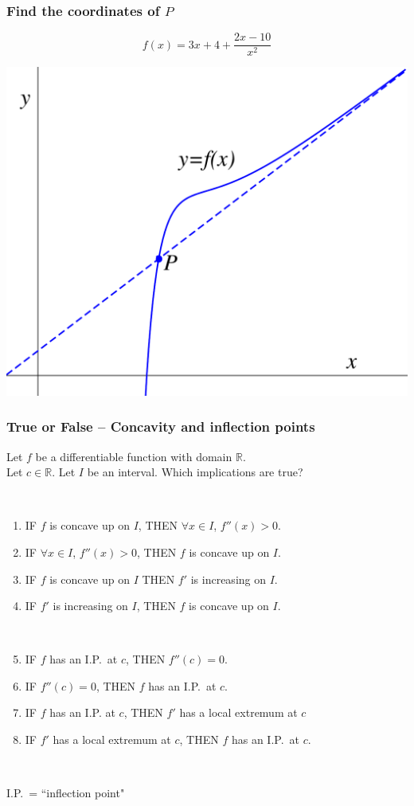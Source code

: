 \documentclass[14pt]{beamer}
\newcommand {\R}{\mathbb{R}}
\newcommand{\azul}[1]{{\color{blue} #1}}
\newcommand{\rojo}[1]{{\color{red} #1}}
\newcommand{\verde}[1]{{\color{verde} #1}}
\newcommand{\rosa}[1]{{\color{rosa} #1}}
\newcommand{\naranja}[1]{{\color{naranja} #1}}
\newcommand{\violeta}[1]{{\color{violet} #1}}
\newcommand{\setsize}[1]{\fontsize{#1}{#1}\selectfont} %
\newcommand{\smallerfont}{\setsize{13}} %
\begin{document}
\begin{frame}[t]
\frametitle{Find the coordinates of $P$ }

$$f(x) = 3x+4 +  \frac{2x-10}{x^2}$$

\begin{center}
\includegraphics[scale=0.4]{G17}
\end{center}

\end{frame}
\begin{frame}[t]
\smallerfont
\frametitle{True or False -- Concavity and inflection points}

Let $f$ be a {{differentiable}} function with domain $\R$.  \\
Let $c \in \R$.  Let $I$ be an interval.  Which implications are true?

\
\begin{enumerate}
	\item	 IF \rojo{$f$ is concave up on $I$}, \quad  THEN \azul{$\forall x \in I$, $f''(x) >0$}.
	\item	 IF \azul{$\forall x \in I$, $f''(x) >0$}, \quad THEN \rojo{$f$ is concave up on $I$}.
	\item	 IF \rojo{$f$ is concave up on $I$} \quad THEN \verde{$f'$ is increasing on $I$}.
	\item	 IF \verde{$f'$ is increasing  on $I$}, \quad  THEN \rojo{$f$ is concave up on $I$}.
	
	\
	\item  IF \rosa{$f$ has an I.P.\ at $c$}, \quad THEN \naranja{$f''(c)=0$}.
	\item IF \naranja{$f''(c)=0$}, \quad THEN \rosa{$f$ has an I.P.\ at $c$}.
	\item  IF \rosa{$f$ has an I.P. at $c$}, \quad THEN \violeta{$f'$ has a local extremum at $c$}
	\item IF \violeta{$f'$ has a local extremum at $c$}, \quad THEN \rosa{$f$ has an I.P.\ at $c$}.
\end{enumerate}
\
\begin{center}
I.P.\  = ``inflection point"
\end{center}
\end{frame}
\end{document}
